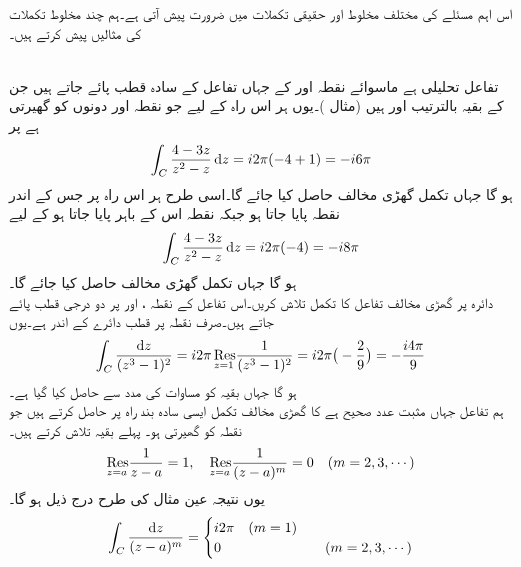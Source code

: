 اس اہم مسئلے کی مختلف مخلوط اور حقیقی تکملات  میں ضرورت پیش آتی ہے۔ہم چند مخلوط تکملات کی مثالیں پیش کرتے ہیں۔

\quad {}\\
تفاعل  تحلیلی ہے  ماسوائے نقطہ  اور  کے جہاں تفاعل کے سادہ قطب پائے جاتے ہیں جن کے بقیہ بالترتیب  اور  ہیں (مثال )۔یوں ہر اس راہ  کے لیے جو نقطہ  اور  دونوں کو گھیرتی ہے پر 
\begin{align*}
\int_C \frac{4-3z}{z^2-z}\dif z=i2\pi(-4+1)=-i6\pi
\end{align*} 
ہو گا جہاں تکمل گھڑی مخالف حاصل کیا جائے گا۔اسی طرح ہر اس راہ  پر جس کے اندر نقطہ  پایا جاتا ہو جبکہ نقطہ  اس کے باہر پایا جاتا ہو کے لیے
\begin{align*}
\int_C \frac{4-3z}{z^2-z}\dif z=i2\pi(-4)=-i8\pi
\end{align*} 
ہو گا جہاں تکمل گھڑی مخالف حاصل کیا جائے گا۔
\quad {}\\
دائرہ  پر گھڑی مخالف تفاعل  کا تکمل تلاش کریں۔اس تفاعل کے نقطہ ،  اور  پر دو درجی قطب پائے جاتے ہیں۔صرف نقطہ  پر قطب دائرے کے اندر ہے۔یوں
\begin{align*}
\int_C \frac{\dif z}{(z^3-1)^2}=i2\pi \,\underset{z=1\hfill}{\Res} \frac{1}{(z^3-1)^2}=i2\pi\big(-\frac{2}{9}\big)=-\frac{i4\pi}{9}
\end{align*}
ہو گا جہاں بقیہ کو مساوات  کی مدد سے حاصل کیا گیا ہے۔
\quad {}\\
ہم تفاعل  جہاں  مثبت عدد صحیح ہے کا گھڑی مخالف تکمل ایسی سادہ بند راہ   پر حاصل کرتے ہیں جو نقطہ  کو گھیرتی ہو۔ پہلے بقیہ تلاش کرتے ہیں۔
\begin{align*}
\underset{z=a\hfill}{\Res} \frac{1}{z-a}=1,\quad \underset{z=a\hfill}{\Res} \frac{1}{(z-a)^m}=0 \quad (m=2,3,\cdots)
\end{align*}
یوں نتیجہ  عین مثال  کی طرح درج ذیل ہو گا۔
\begin{align*}
\int_C \frac{\dif z}{(z-a)^m}=
\begin{cases}
i2\pi \quad (m=1)\\
0&\quad (m=2,3,\cdots)
\end{cases}
\end{align*}

